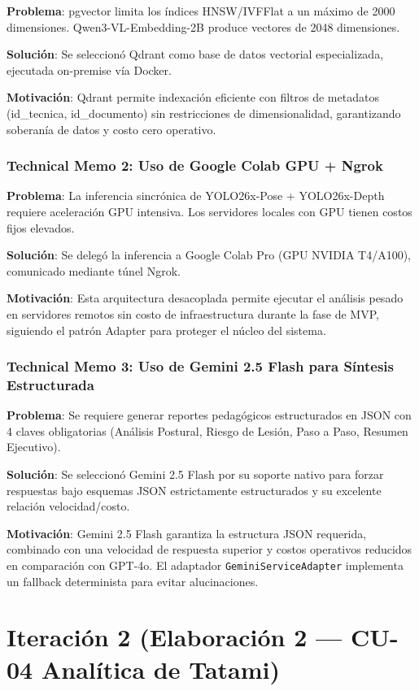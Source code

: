 \documentclass[12pt,letterpaper]{article}
\begin{document}
\textbf{Problema}: pgvector limita los índices HNSW/IVFFlat a un máximo de 2000 dimensiones. Qwen3-VL-Embedding-2B produce vectores de 2048 dimensiones.

\textbf{Solución}: Se seleccionó Qdrant como base de datos vectorial especializada, ejecutada on-premise vía Docker.

\textbf{Motivación}: Qdrant permite indexación eficiente con filtros de metadatos (id\_tecnica, id\_documento) sin restricciones de dimensionalidad, garantizando soberanía de datos y costo cero operativo.

\subsubsection{Technical Memo 2: Uso de Google Colab GPU + Ngrok}

\textbf{Problema}: La inferencia sincrónica de YOLO26x-Pose + YOLO26x-Depth requiere aceleración GPU intensiva. Los servidores locales con GPU tienen costos fijos elevados.

\textbf{Solución}: Se delegó la inferencia a Google Colab Pro (GPU NVIDIA T4/A100), comunicado mediante túnel Ngrok.

\textbf{Motivación}: Esta arquitectura desacoplada permite ejecutar el análisis pesado en servidores remotos sin costo de infraestructura durante la fase de MVP, siguiendo el patrón Adapter para proteger el núcleo del sistema.

\subsubsection{Technical Memo 3: Uso de Gemini 2.5 Flash para Síntesis Estructurada}

\textbf{Problema}: Se requiere generar reportes pedagógicos estructurados en JSON con 4 claves obligatorias (Análisis Postural, Riesgo de Lesión, Paso a Paso, Resumen Ejecutivo).

\textbf{Solución}: Se seleccionó Gemini 2.5 Flash por su soporte nativo para forzar respuestas bajo esquemas JSON estrictamente estructurados y su excelente relación velocidad/costo.

\textbf{Motivación}: Gemini 2.5 Flash garantiza la estructura JSON requerida, combinado con una velocidad de respuesta superior y costos operativos reducidos en comparación con GPT-4o. El adaptador \texttt{GeminiServiceAdapter} implementa un fallback determinista para evitar alucinaciones.

\newpage
\section{Iteración 2 (Elaboración 2 — CU-04 Analítica de Tatami)}
\label{sec:iteracion-2}
\end{document}
